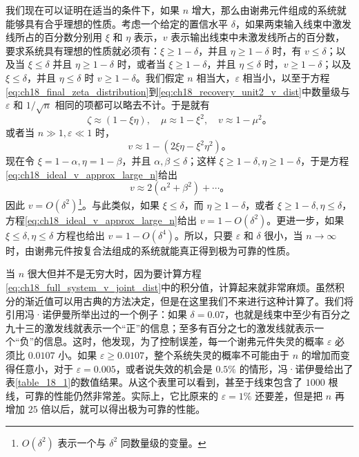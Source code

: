 我们现在可以证明在适当的条件下，如果 $n$ 增大，那么由谢弗元件组成的系统就能够具有合乎理想的性质。考虑一个给定的置信水平 $\delta$，如果两束输入线束中激发线所占的百分数分别用 $\xi$ 和 $\eta$ 表示，$v$ 表示输出线束中未激发线所占的百分数，要求系统具有理想的性质就必须有：$\xi\geqslant1-\delta$，并且 $\eta\geqslant1-\delta$ 时，有 $v\leqslant\delta$；以及当 $\xi\leqslant\delta$ 并且 $\eta\geqslant1-\delta$ 时，或者当 $\xi\geqslant1-\delta$，并且 $\eta\leqslant\delta$ 时，$v\geqslant1-\delta$；以及 $\xi\leqslant\delta$，并且 $\eta\leqslant\delta$ 时 $v\geqslant1-\delta$。我们假定 $n$ 相当大，$\varepsilon$ 相当小，以至于方程\eqref{eq:ch18_final_zeta_distribution}到\eqref{eq:ch18_recovery_unit2_v_dist}中数量级与 $\varepsilon$ 和 $1/\sqrt{n}$ 相同的项都可以略去不计。于是就有
\[
\zeta\approx(1-\xi\eta),\quad \mu\approx1-\xi^2,\quad v\approx1-\mu^2。
\]
或者当 $n\gg1,\varepsilon\ll1$ 时，
\begin{equation}
v \approx 1 - (2\xi\eta - \xi^2\eta^2)。
\label{eq:ch18_ideal_v_approx_large_n}
\end{equation}
现在令 $\xi=1-\alpha,\eta=1-\beta$，并且 $\alpha,\beta\leqslant\delta$；这样 $\xi\geqslant1-\delta,\eta\geqslant1-\delta$，于是方程\eqref{eq:ch18_ideal_v_approx_large_n}给出
\[
v \approx 2(\alpha^2+\beta^2)+\cdots。
\]
因此 $v=O(\delta^2)$\footnote{$O(\delta^2)$ 表示一个与 $\delta^2$ 同数量级的变量。}。与此类似，如果 $\xi\leqslant\delta$，而 $\eta\geqslant1-\delta$，或者 $\xi\geqslant1-\delta,\eta\leqslant\delta$，方程\eqref{eq:ch18_ideal_v_approx_large_n}给出 $v=1-O(\delta^2)$。更进一步，如果 $\xi\leqslant\delta,\eta\leqslant\delta$ 方程也给出 $v=1-O(\delta^4)$。所以，只要 $\varepsilon$ 和 $\delta$ 很小，当 $n\to\infty$ 时，由谢弗元件按复合法组成的系统就能真正得到极为可靠的性质。

当 $n$ 很大但并不是无穷大时，因为要计算方程\eqref{eq:ch18_full_system_v_joint_dist}中的积分值，计算起来就非常麻烦。虽然积分的渐近值可以用古典的方法决定，但是在这里我们不来进行这种计算了。我们将引用冯·诺伊曼所举出过的一个例子：如果 $\delta=0.07$，也就是线束中至少有百分之九十三的激发线就表示一个“正”的信息；至多有百分之七的激发线就表示一个“负”的信息。这时，他发现，为了控制误差，每一个谢弗元件失灵的概率 $\varepsilon$ 必须比 $0.0107$ 小。如果 $\varepsilon\geqslant0.0107$，整个系统失灵的概率不可能由于 $n$ 的增加而变得任意小，对于 $\varepsilon=0.005$，或者说失效的机会是 $0.5\%$ 的情形，冯·诺伊曼给出了表\ref{table_18_1}的数值结果。从这个表里可以看到，甚至于线束包含了 $1000$ 根线，可靠的性能仍然非常差。实际上，它比原来的 $\varepsilon=1\%$ 还要差，但是把 $n$ 再增加 $25$ 倍以后，就可以得出极为可靠的性能。


